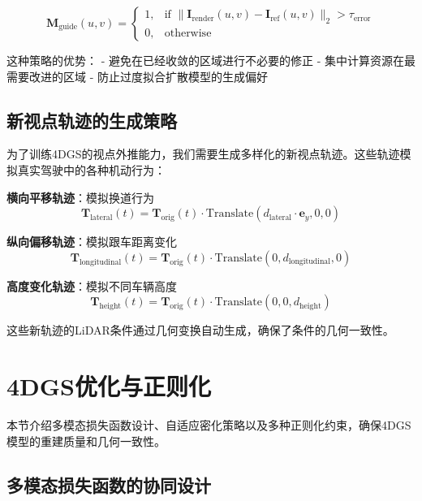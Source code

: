 \begin{equation}
\mathbf{M}_{\text{guide}}(u,v) = \begin{cases}
1, & \text{if } \|\mathbf{I}_{\text{render}}(u,v) - \mathbf{I}_{\text{ref}}(u,v)\|_2 > \tau_{\text{error}} \\
0, & \text{otherwise}
\end{cases}
\label{eq:masked_guidance}
\end{equation}

这种策略的优势：
- 避免在已经收敛的区域进行不必要的修正
- 集中计算资源在最需要改进的区域
- 防止过度拟合扩散模型的生成偏好

\subsection{新视点轨迹的生成策略}

为了训练4DGS的视点外推能力，我们需要生成多样化的新视点轨迹。这些轨迹模拟真实驾驶中的各种机动行为：

\textbf{横向平移轨迹}：模拟换道行为
\begin{equation}
\mathbf{T}_{\text{lateral}}(t) = \mathbf{T}_{\text{orig}}(t) \cdot \text{Translate}(d_{\text{lateral}} \cdot \mathbf{e}_y, 0, 0)
\label{eq:lateral_trajectory}
\end{equation}

\textbf{纵向偏移轨迹}：模拟跟车距离变化
\begin{equation}
\mathbf{T}_{\text{longitudinal}}(t) = \mathbf{T}_{\text{orig}}(t) \cdot \text{Translate}(0, d_{\text{longitudinal}}, 0)
\label{eq:longitudinal_trajectory}
\end{equation}

\textbf{高度变化轨迹}：模拟不同车辆高度
\begin{equation}
\mathbf{T}_{\text{height}}(t) = \mathbf{T}_{\text{orig}}(t) \cdot \text{Translate}(0, 0, d_{\text{height}})
\label{eq:height_trajectory}
\end{equation}

这些新轨迹的LiDAR条件通过几何变换自动生成，确保了条件的几何一致性。

\section{4DGS优化与正则化}

本节介绍多模态损失函数设计、自适应密化策略以及多种正则化约束，确保4DGS模型的重建质量和几何一致性。

\subsection{多模态损失函数的协同设计}

